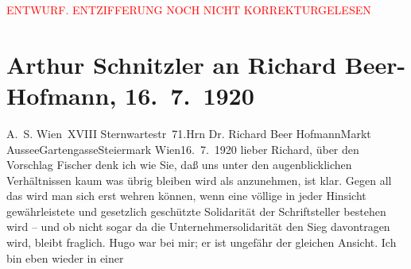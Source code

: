 
\begin{center}
            \textcolor{red}{ENTWURF. ENTZIFFERUNG NOCH NICHT KORREKTURGELESEN}
                      \end{center}
            
               \section[Arthur Schnitzler an Richard Beer-Hofmann, 16. 7. 1920]{ Arthur Schnitzler an Richard Beer-Hofmann, 16. 7. 1920}\nopagebreak{}\rehead{ }\begin{ledgroupsized}[t]{13cm}\normalsize\beginnumbering{} \toendnotes[C]{\smallbreak\pagebreak[2]} 
\toendnotes[C]{\smallbreak}\pstart{}{\pb}A. S. Wien XVIII
                     Sternwartestr 71.\pend{}{\bigskip}\pstart{}{\pb}Hrn Dr. Richard Beer Hofmann\pend{}\pstart{}Markt Aussee\pend{}\pstart{}Gartengasse\pend{}\pstart{}Steiermark\pend{}{\bigskip}\pstart
           \raggedleft{}{\pb}Wien16. 7. 1920\pend
           \pstart{}lieber Richard,\pend\pstart
           über den Vorschlag Fischer denk ich wie Sie, daß
               uns unter den augenblicklichen Verhältnissen kaum was übrig bleiben wird als
               anzunehmen, ist klar. Gegen all das wird man sich erst wehren können, wenn eine
               völlige in jeder Hinsicht gewährleistete und gesetzlich geschützte Solidarität der
               Schriftsteller bestehen wird – und ob nicht sogar da{\geminationn}
               die Unternehmersolidarität den Sieg davontragen wird, bleibt fraglich. Hugo war \label{KLL02350_Beer-Hofmann-1v}\label{KLL02350_Beer-Hofmann-1h} bei mir; er ist ungefähr der gleichen Ansicht. Ich bin eben wieder in einer

\end{ledgroupsized}
